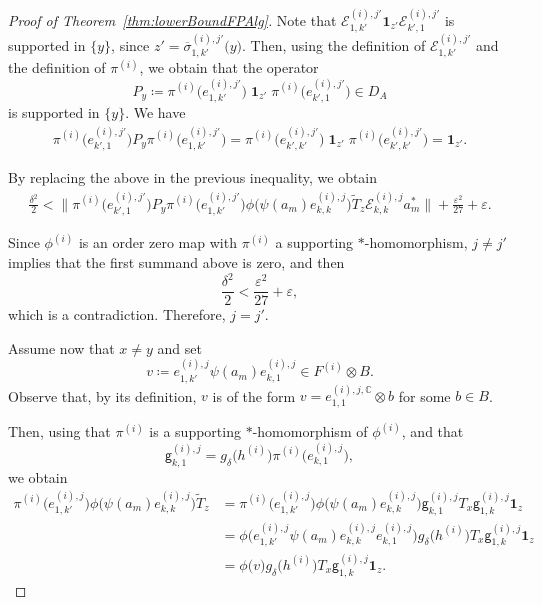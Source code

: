 \documentclass[10pt,a4paper]{amsart}
\newcommand{\C}{\mathbb{C}}
\newcommand{\Ecal}{\mathcal{E}}
\newcommand{\e}{\varepsilon}
\newcommand{\gUnMatImg}[3]{{ \mathsf{g}_{#3}^{(#1), #2}}}
\newcommand{\indF}{\mathbf{1}}
\newcommand{\myhyp}{\textnormal{-}\hskip0pt\relax}
\newcommand{\normBig}[1]{{\Big\lVert #1 \Big \rVert}}
\newcommand{\prn}[1]{{(#1)}}
\newcommand{\unMatImg}[3]{{\Ecal_{#3}^{(#1), #2}}}
\begin{document}
\begin{proof}[Proof of Theorem~\ref{thm:lowerBoundFPAlg}]
        Note that
        ${\unMatImg{i}{j'}{1,k'} \indF_{z'} \unMatImg{i}{j'}{k',1}}$
        is supported in $\{y\}$,
        since ${z' = \overline{\sigma}_{1,k'}^{(i),j'}\big(y \big)}$.
        Then, using the definition of ${\unMatImg{i}{j'}{1,k'}}$
    and the definition of $\pi^{(i)}$, we obtain that the operator
    \begin{equation*}
        P_y \coloneq \pi^{(i)}\big(e^{\prn{i},j'}_{1,k'} \big) \; \indF_{z'} \;\pi^{(i)}\big(e^{\prn{i},j'}_{k',1} \big) \in D_A 
    \end{equation*}
    is supported in $\{y\}$.
    We have
    \begin{align*}
        \pi^{(i)}\big(e^{\prn{i},j'}_{k',1} \big)  P_y \pi^{(i)}\big(e^{\prn{i},j'}_{1,k'} \big)
        = \pi^{(i)}\big(e^{\prn{i},j'}_{k',k'} \big) \; \indF_{z' } \;\pi^{(i)}\big(e^{\prn{i},j'}_{k',k'} \big) 
        = 
        \indF_{z'}.
    \end{align*}

        By replacing the above in the previous inequality, we obtain
        \begin{align} \label{ineq:xNEyIneq}
          \frac{\delta^2}{2}
           <  \normBig{\pi^{(i)}\big(e^{\prn{i},j'}_{k',1} \big)  P_y \pi^{(i)}\big(e^{\prn{i},j'}_{1,k'} \big) {\phi}\big({\psi}(a_m) e_{k,k}^{(i),j} \big)   \widetilde{T}_{z} \unMatImg{i}{j}{k,k} a_m^\ast} + \frac{\e^2}{27} +\e.
        \end{align}

        Since $\phi^{(i)}$ is an order zero map with $\pi^{\prn{i}}$ a supporting $\ast$\myhyp{}homomorphism,
        ${j \ne j'}$ 
        implies that the first summand above is zero, and then
        \[\frac{\delta^2}{2}
          < \frac{\e^2}{27} +\e,\]
        which is a contradiction. 
        Therefore, $j=j'$.

        Assume now that ${x \ne y}$ and
        set 
        \[v \coloneq e^{{(i)},{j}}_{1,k'} \psi(a_m) e^{{(i)},{j}}_{k,1} \in F^{\prn{i}} \otimes B.\] 
        Observe that, by its definition,
        $v$ is of the form ${v = e^{{(i)},{j},\C}_{1,1} \otimes b}$ for some ${b \in B}$.
        
        Then, 
        using that ${\pi^{\prn{i}}}$ is a supporting $\ast$\myhyp{}homomorphism of $\phi^{(i)}$, 
        and that 
        \[\gUnMatImg{i}{j}{k,1} =g_\delta\big(h^{(i)} \big) \pi^{(i)}\big(e^{{(i)},{j}}_{k,1}\big),\]
        we obtain
        \begin{align*}
            \pi^{(i)}\big(e^{\prn{i},j}_{1,k'} \big) {\phi}\big({\psi}(a_m) e_{k,k}^{(i),j} \big)   \widetilde{T}_{z}
            & = \pi^{(i)}\big(e^{\prn{i},j}_{1,k'} \big) {\phi}\big({\psi}(a_m) e_{k,k}^{(i),j} \big)    \gUnMatImg{i}{j}{k,1} T_x \gUnMatImg{i}{j}{1,k}  \indF_{z}\\
            & =  {\phi}\big( e^{\prn{i},j}_{1,k'} {\psi}(a_m) e_{k,k}^{(i),j} e^{\prn{i},j}_{k,1} \big)   g_\delta\big(h^{(i)}\big) T_x \gUnMatImg{i}{j}{1,k}  \indF_{z}\\
           &  =  {\phi}\big( v \big)   g_\delta\big(h^{(i)}\big) T_x \gUnMatImg{i}{j}{1,k}  \indF_{z}.
        \end{align*}
    

\end{proof}
\end{document}
